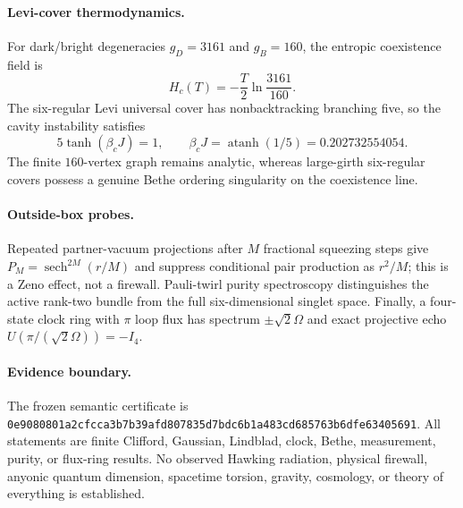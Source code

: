 \paragraph{Levi-cover thermodynamics.}
For dark/bright degeneracies $g_D=3161$ and $g_B=160$, the entropic
coexistence field is
\[
 H_c(T)=-\frac{T}{2}\ln\frac{3161}{160}.
\]
The six-regular Levi universal cover has nonbacktracking branching five, so
the cavity instability satisfies
\[
 5\tanh(\beta_cJ)=1,
 \qquad \beta_cJ=\operatorname{atanh}(1/5)=0.202732554054.
\]
The finite $160$-vertex graph remains analytic, whereas large-girth
six-regular covers possess a genuine Bethe ordering singularity on the
coexistence line.

\paragraph{Outside-box probes.}
Repeated partner-vacuum projections after $M$ fractional squeezing steps give
$P_M=\operatorname{sech}^{2M}(r/M)$ and suppress conditional pair production
as $r^2/M$; this is a Zeno effect, not a firewall.  Pauli-twirl purity
spectroscopy distinguishes the active rank-two bundle from the full
six-dimensional singlet space.  Finally, a four-state clock ring with
$\pi$ loop flux has spectrum $\pm\sqrt2\Omega$ and exact projective echo
$U(\pi/(\sqrt2\Omega))=-I_4$.

\paragraph{Evidence boundary.}
The frozen semantic certificate is
\texttt{0e9080801a2cfcca3b7b39afd807835d7bdc6b1a483cd685763b6dfe63405691}.
All statements are finite Clifford, Gaussian, Lindblad, clock, Bethe,
measurement, purity, or flux-ring results.  No observed Hawking radiation,
physical firewall, anyonic quantum dimension, spacetime torsion, gravity,
cosmology, or theory of everything is established.

